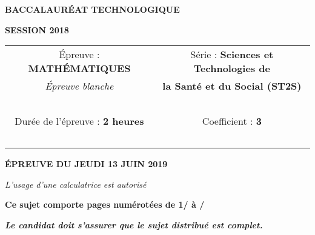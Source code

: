 \begin{center}
	
	{\scshape\LARGE \textbf{BACCALAUR\'EAT TECHNOLOGIQUE} \par}
	\vspace{1cm}
	{\scshape\Large \textbf{SESSION 2018}\par}
	\vspace{1.5cm}
	

	\begin{large}
		\begin{tabular}{|@{\ }c@{\ }|@{\ }c@{\ }|}
		\hline
		\'Epreuve : \textbf{MATH\'EMATIQUES} & Série : \textbf{Sciences et Technologies de}  \\ 
		\textit{\'Epreuve blanche}&  \textbf{la Santé et du Social (ST2S)} \\ \hline
		\ & \ \\
		Durée de l'épreuve : \textbf{2 heures} & Coefficient : \textbf{3} \\ 
		\ & \ \\
		\hline
	\end{tabular}
	\end{large}
		
	\vspace{1cm}
	{\large\bfseries \'EPREUVE DU JEUDI 13 JUIN 2019}
	
	\vspace{1cm}
	{\itshape L'usage d'une calculatrice est autorisé\par}
	\vspace{1.5cm}
	{\bfseries Ce sujet comporte \pageref{LastPage} pages numérotées de 1/\pageref{LastPage} à \pageref{LastPage}/\pageref{LastPage} }
	
	
	\vspace{0.5cm}
	{\bfseries\itshape Le candidat doit s'assurer que le sujet distribué est complet. }
	
	\vfill	
	
	
	\vfill

\end{center}
\newpage